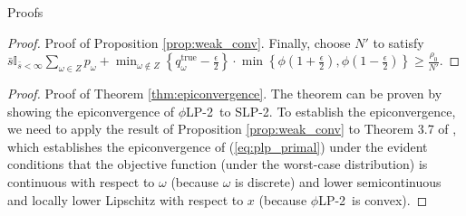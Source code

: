 \documentclass[ijoc,letterpaper]{informs3} %
\newcommand{\qtrue}{q^{\text{true}}}
\newcommand{\plp}{$\phi$LP-2}
\begin{document}
\begin{APPENDIX}{Proofs}
\begin{proof}{\sc Proof of Proposition \ref{prop:weak_conv}.}
	Finally, choose $N'$ to satisfy $\bar{s} \mathbb{I}_{\bar{s} < \infty} \sum_{\omega \in Z} p_\omega + \min_{\omega \notin Z} \left\{ \qtrue_\omega - \frac{\epsilon}{2} \right\} \cdot \min\left\{ \phi\left(1+\frac{\epsilon}{2}\right), \phi\left(1-\frac{\epsilon}{2}\right) \right\} \geq \frac{\rho_0}{N'}$.
	\Halmos
\end{proof}

\begin{proof}{\sc Proof of Theorem \ref{thm:epiconvergence}.}
	The theorem can be proven by showing the epiconvergence of \plp\ to SLP-2.
	To establish the epiconvergence, we need to apply the result of Proposition \ref{prop:weak_conv} to Theorem 3.7 of \cite{dupacova1988asymptotic}, which establishes the epiconvergence of (\ref{eq:plp_primal}) under the evident conditions that the objective function (under the worst-case distribution) is continuous with respect to $\omega$ (because $\omega$ is discrete) and lower semicontinuous and locally lower Lipschitz with respect to $x$ (because \plp\ is convex).
	\Halmos
\end{proof}

\end{APPENDIX}
%
%






\end{document}
